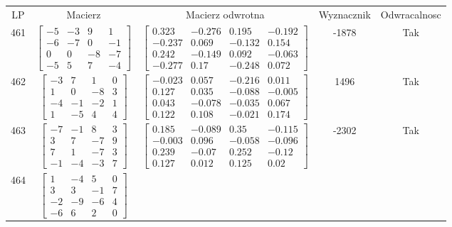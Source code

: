 \documentclass[a4paper,12pt]{article}
\begin{document}
\bgroup {} \vspace{0.2in} \begin{tabular}{c c c c c}
LP & Macierz & Macierz odwrotna & Wyznacznik & Odwracalnosc\\
461
&
$\begin{bmatrix} -5 & -3 & 9 & 1 \\ -6 & -7 & 0 & -1 \\ 0 & 0 & -8 & -7 \\ -5 & 5 & 7 & -4 \end{bmatrix}$
&
$\begin{bmatrix} 0.323 & -0.276 & 0.195 & -0.192 \\ -0.237 & 0.069 & -0.132 & 0.154 \\ 0.242 & -0.149 & 0.092 & -0.063 \\ -0.277 & 0.17 & -0.248 & 0.072 \end{bmatrix}$
&
-1878
&
Tak
\\
462
&
$\begin{bmatrix} -3 & 7 & 1 & 0 \\ 1 & 0 & -8 & 3 \\ -4 & -1 & -2 & 1 \\ 1 & -5 & 4 & 4 \end{bmatrix}$
&
$\begin{bmatrix} -0.023 & 0.057 & -0.216 & 0.011 \\ 0.127 & 0.035 & -0.088 & -0.005 \\ 0.043 & -0.078 & -0.035 & 0.067 \\ 0.122 & 0.108 & -0.021 & 0.174 \end{bmatrix}$
&
1496
&
Tak
\\
463
&
$\begin{bmatrix} -7 & -1 & 8 & 3 \\ 3 & 7 & -7 & 9 \\ 7 & 1 & -7 & 3 \\ -1 & -4 & -3 & 7 \end{bmatrix}$
&
$\begin{bmatrix} 0.185 & -0.089 & 0.35 & -0.115 \\ -0.003 & 0.096 & -0.058 & -0.096 \\ 0.239 & -0.07 & 0.252 & -0.12 \\ 0.127 & 0.012 & 0.125 & 0.02 \end{bmatrix}$
&
-2302
&
Tak
\\
464
&
$\begin{bmatrix} 1 & -4 & 5 & 0 \\ 3 & 3 & -1 & 7 \\ -2 & -9 & -6 & 4 \\ -6 & 6 & 2 & 0 \end{bmatrix}$

\end{tabular}
\end{document}
